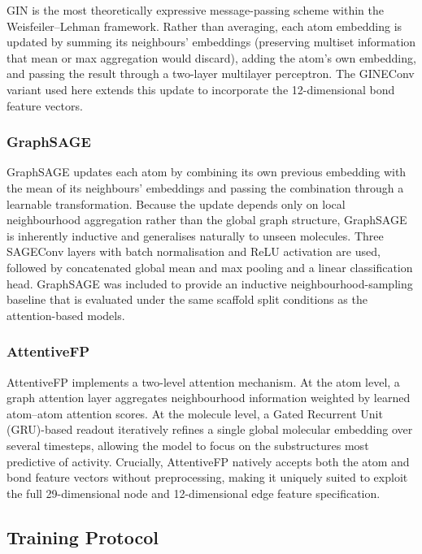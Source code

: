 GIN is the most theoretically expressive message-passing scheme within the
Weisfeiler--Lehman framework. Rather than averaging, each atom embedding is updated
by summing its neighbours' embeddings (preserving multiset information that mean or
max aggregation would discard), adding the atom's own embedding, and passing the
result through a two-layer multilayer perceptron. The GINEConv variant used here
extends this update to incorporate the 12-dimensional bond feature vectors.

\subsubsection{GraphSAGE}

GraphSAGE \parencite{hamilton2017graphsage} updates each atom by combining its own
previous embedding with the mean of its neighbours' embeddings and passing the
combination through a learnable transformation. Because the update depends only on
local neighbourhood aggregation rather than the global graph structure, GraphSAGE
is inherently inductive and generalises naturally to unseen molecules. Three
SAGEConv layers with batch normalisation and ReLU activation are used, followed by
concatenated global mean and max pooling and a linear classification head.
GraphSAGE was included to provide an inductive neighbourhood-sampling baseline that
is evaluated under the same scaffold split conditions as the attention-based models.

\subsubsection{AttentiveFP}

AttentiveFP implements a two-level attention mechanism. At the atom level, a graph
attention layer aggregates neighbourhood information weighted by learned
atom--atom attention scores. At the molecule level, a Gated Recurrent Unit
(GRU)-based readout iteratively refines a single global molecular embedding over
several timesteps, allowing the model to focus on the substructures most predictive
of activity. Crucially, AttentiveFP natively accepts both the atom and bond feature
vectors without preprocessing, making it uniquely suited to exploit the full
29-dimensional node and 12-dimensional edge feature specification.

\subsection{Training Protocol}

